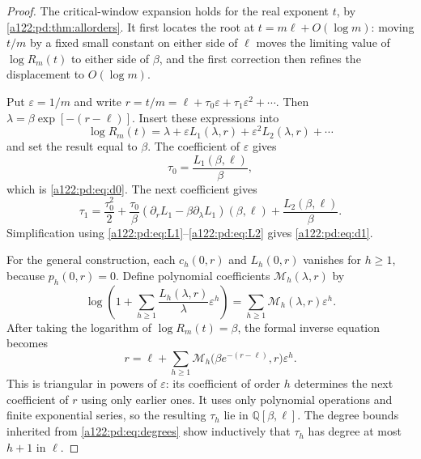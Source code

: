 \documentclass[11pt,letterpaper]{article}
\numberwithin{equation}{subsection}
\theoremstyle{definition}
\theoremstyle{remark}
\theoremstyle{plain}
\begin{document}
\begin{proof}
The critical-window expansion holds for the real exponent $t$, by
\cref{a122:pd:thm:allorders}. It first locates the root at
$t=m\ell+O(\log m)$: moving $t/m$ by a fixed small constant on either
side of $\ell$ moves the limiting value of $\log R_m(t)$ to either
side of $\beta$, and the first correction then refines the displacement
to $O(\log m)$.

Put $\varepsilon=1/m$ and write
$r=t/m=\ell+\tau_0\varepsilon+\tau_1\varepsilon^2+\cdots$.
Then
$\lambda=\beta\exp[-(r-\ell)]$.
Insert these expressions into
\[
 \log R_m(t)=\lambda+\varepsilon L_1(\lambda,r)
                  +\varepsilon^2L_2(\lambda,r)+\cdots
\]
and set the result equal to $\beta$.
The coefficient of $\varepsilon$ gives
\[
 \tau_0=\frac{L_1(\beta,\ell)}\beta,
\]
which is \eqref{a122:pd:eq:d0}. The next coefficient gives
\begin{equation}\label{a122:pd:eq:d1algorithm}
 \tau_1=\frac{\tau_0^2}{2}
 +\frac{\tau_0}{\beta}
  (\partial_rL_1-\beta\partial_\lambda L_1)(\beta,\ell)
 +\frac{L_2(\beta,\ell)}\beta.
\end{equation}
Simplification using \eqref{a122:pd:eq:L1}--\eqref{a122:pd:eq:L2} gives
\eqref{a122:pd:eq:d1}.

For the general construction, each $c_h(0,r)$ and $L_h(0,r)$ vanishes
for $h\ge1$, because $p_h(0,r)=0$.
Define polynomial coefficients $\mathcal M_h(\lambda,r)$ by
\begin{equation}\label{a122:pd:eq:Mh}
 \log\left(1+\sum_{h\ge1}\frac{L_h(\lambda,r)}\lambda
                     \varepsilon^h\right)
 =\sum_{h\ge1}\mathcal M_h(\lambda,r)\varepsilon^h.
\end{equation}
After taking the logarithm of $\log R_m(t)=\beta$, the formal inverse
equation becomes
\begin{equation}\label{a122:pd:eq:inversefixed}
 r=\ell+\sum_{h\ge1}
 \mathcal M_h\bigl(\beta e^{-(r-\ell)},r\bigr)\varepsilon^h.
\end{equation}
This is triangular in powers of $\varepsilon$: its coefficient of
order $h$ determines the next coefficient of $r$ using only earlier
ones. It uses only polynomial operations and finite exponential series,
so the resulting $\tau_h$ lie in $\mathbb Q[\beta,\ell]$.
The degree bounds inherited from \eqref{a122:pd:eq:degrees} show inductively
that $\tau_h$ has degree at most $h+1$ in $\ell$.


\end{proof}
\end{document}
